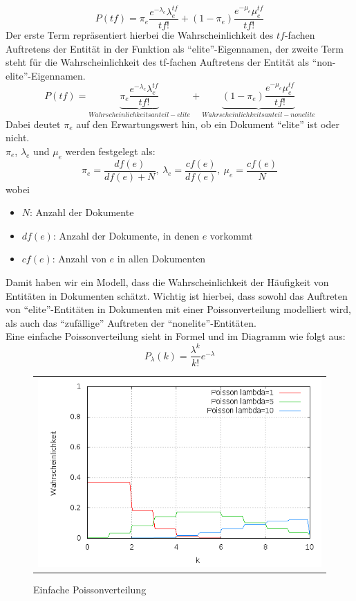 \begin{equation}
P\left( tf \right)=\pi_e\frac{e^{-\lambda_e}\lambda_{e}^{ tf }}{tf!}+\left( 1-\pi_e \right)\frac{e^{-\mu_e} \mu_e^{tf}}{tf!}
\end{equation}
Der erste Term repräsentiert hierbei die Wahrscheinlichkeit des $tf$-fachen Auftretens der Entität in der Funktion als ``elite''-Eigennamen, der zweite Term steht für die Wahrscheinlichkeit des tf-fachen Auftretens der Entität als ``non-elite''-Eigennamen.
\[P\left( tf \right)=\underbrace{\pi_e\frac{e^{-\lambda_e}\lambda_{e}^{ tf }}{tf!}}_{Wahrscheinlichkeitsanteil - elite} +\underbrace{\left( 1-\pi_e \right)\frac{e^{-\mu_e} \mu_e^{tf}}{tf!}}_{Wahrscheinlichkeitsanteil - nonelite}\]
Dabei deutet $\pi_e$ auf den Erwartungswert hin, ob ein Dokument ``elite'' ist oder nicht.\\
$\pi_e$, $\lambda_e$ und $\mu_e$ werden festgelegt als:
\[\pi_e=\frac{df\left( e \right)}{df\left( e \right)+N}, \ \lambda_e=\frac{cf\left( e \right)}{df\left( e \right)}, \ \mu_e=\frac{cf(e)}{N}\]
wobei
\begin{itemize}
	
	\item $N$: Anzahl der Dokumente
	\item $df(e)$: Anzahl der Dokumente, in denen $e$ vorkommt
	\item $cf(e)$: Anzahl von $e$ in allen Dokumenten
\end{itemize}
Damit haben wir ein Modell, dass die Wahrscheinlichkeit der Häufigkeit von Entitäten in Dokumenten schätzt. Wichtig ist hierbei, dass sowohl das Auftreten von ``elite''-Entitäten in Dokumenten mit einer Poissonverteilung modelliert wird, als auch das ``zufällige'' Auftreten der ``nonelite''-Entitäten.\\
Eine einfache Poissonverteilung sieht in Formel und im Diagramm wie folgt aus:
\[P_\lambda(k)=\frac{\lambda^k}{k!}e^{-\lambda}\]
\begin{figure}[h]
	\centering
	\begin{tabular}{c}
		\includegraphics[scale=0.5]{pics/poisson_basic}
	\end{tabular}
	\caption{Einfache Poissonverteilung}
	\label{tab:poisson_basic}
\end{figure}

